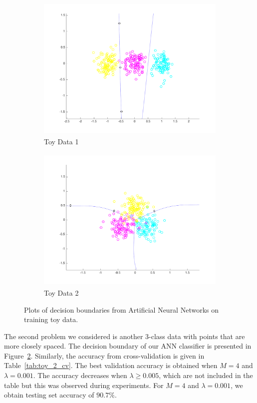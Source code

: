 \begin{figure}[h!]
\centering
    \begin{subfigure}[b]{0.45\textwidth}
	\includegraphics[height=70mm]{plot_toy_multiclass_1.pdf}
	\caption{Toy Data 1}\label{fig:toy_1}
    \end{subfigure}
    \quad
    \begin{subfigure}[b]{0.45\textwidth}
	\includegraphics[height=70mm]{plot_toy_multiclass_2.pdf}
	\caption{Toy Data 2}\label{fig:toy_2}
	\end{subfigure}
    \caption{Plots of decision boundaries from Artificial Neural Networks on training toy data.}  \label{fig:LR_plots}  
\end{figure}

The second problem we considered is another 3-class data with points that are more closely spaced. The decision boundary of our ANN classifier is presented in Figure~\ref{fig:toy_2}. Similarly, the accuracy from cross-validation is given in Table~\ref{tab:toy_2_cv}. The best validation accuracy is obtained when $M = 4$ and $\lambda = 0.001$. The accuracy decreases when $\lambda \geq 0.005$, which are not included in the table but this was observed during experiments. For $M = 4$ and $\lambda = 0.001$, we obtain testing set accuracy of $90.7\%$.


